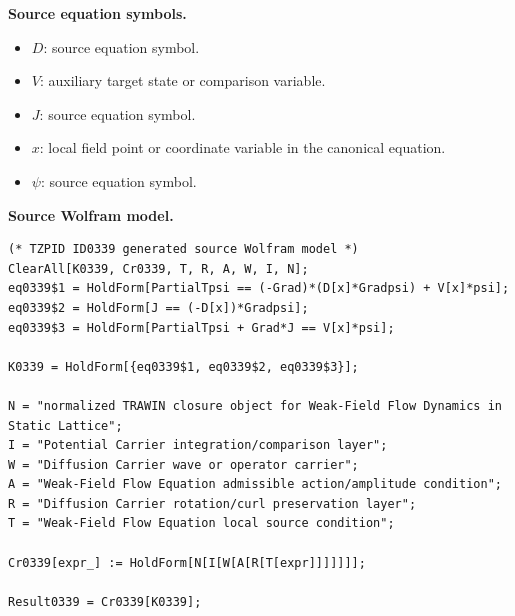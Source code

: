\begin{minipage}[t]{0.49\linewidth}
\begingroup
\small
\raggedright
\textbf{Source equation symbols.}\par
\begin{itemize}[leftmargin=1.35em,itemsep=1pt,topsep=1pt,parsep=0pt]
    \item $D$: source equation symbol.
    \item $V$: auxiliary target state or comparison variable.
    \item $J$: source equation symbol.
    \item $x$: local field point or coordinate variable in the canonical equation.
    \item $\psi$: source equation symbol.
\end{itemize}
\endgroup
\end{minipage}\hfill
\begin{minipage}[t]{0.47\linewidth}
\begingroup
\scriptsize
\raggedright
\textbf{Source Wolfram model.}\par
\begin{Verbatim}[fontsize=\tiny,breaklines=true,breakanywhere=true]
(* TZPID ID0339 generated source Wolfram model *)
ClearAll[K0339, Cr0339, T, R, A, W, I, N];
eq0339$1 = HoldForm[PartialTpsi == (-Grad)*(D[x]*Gradpsi) + V[x]*psi];
eq0339$2 = HoldForm[J == (-D[x])*Gradpsi];
eq0339$3 = HoldForm[PartialTpsi + Grad*J == V[x]*psi];

K0339 = HoldForm[{eq0339$1, eq0339$2, eq0339$3}];

N = "normalized TRAWIN closure object for Weak-Field Flow Dynamics in Static Lattice";
I = "Potential Carrier integration/comparison layer";
W = "Diffusion Carrier wave or operator carrier";
A = "Weak-Field Flow Equation admissible action/amplitude condition";
R = "Diffusion Carrier rotation/curl preservation layer";
T = "Weak-Field Flow Equation local source condition";

Cr0339[expr_] := HoldForm[N[I[W[A[R[T[expr]]]]]]];

Result0339 = Cr0339[K0339];
\end{Verbatim}
\endgroup
\end{minipage}

